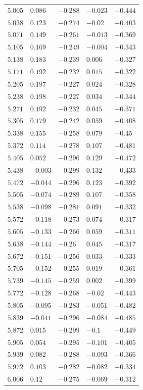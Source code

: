 \begin{table}[h]
\begin{tabular}{rllll}
$5.005$&$0.086$&$-0.288$&$-0.023$&$-0.444$\\
$5.038$&$0.123$&$-0.274$&$-0.02$&$-0.403$\\
$5.071$&$0.149$&$-0.261$&$-0.013$&$-0.369$\\
$5.105$&$0.169$&$-0.249$&$-0.004$&$-0.343$\\
$5.138$&$0.183$&$-0.239$&$0.006$&$-0.327$\\
$5.171$&$0.192$&$-0.232$&$0.015$&$-0.322$\\
$5.205$&$0.197$&$-0.227$&$0.024$&$-0.328$\\
$5.238$&$0.198$&$-0.227$&$0.034$&$-0.344$\\
$5.271$&$0.192$&$-0.232$&$0.045$&$-0.371$\\
$5.305$&$0.179$&$-0.242$&$0.059$&$-0.408$\\
$5.338$&$0.155$&$-0.258$&$0.079$&$-0.45$\\
$5.372$&$0.114$&$-0.278$&$0.107$&$-0.481$\\
$5.405$&$0.052$&$-0.296$&$0.129$&$-0.472$\\
$5.438$&$-0.003$&$-0.299$&$0.132$&$-0.433$\\
$5.472$&$-0.044$&$-0.296$&$0.123$&$-0.392$\\
$5.505$&$-0.074$&$-0.289$&$0.107$&$-0.358$\\
$5.538$&$-0.098$&$-0.281$&$0.091$&$-0.332$\\
$5.572$&$-0.118$&$-0.273$&$0.074$&$-0.317$\\
$5.605$&$-0.133$&$-0.266$&$0.059$&$-0.311$\\
$5.638$&$-0.144$&$-0.26$&$0.045$&$-0.317$\\
$5.672$&$-0.151$&$-0.256$&$0.033$&$-0.333$\\
$5.705$&$-0.152$&$-0.255$&$0.019$&$-0.361$\\
$5.739$&$-0.145$&$-0.259$&$0.002$&$-0.399$\\
$5.772$&$-0.128$&$-0.268$&$-0.02$&$-0.443$\\
$5.805$&$-0.095$&$-0.283$&$-0.051$&$-0.482$\\
$5.839$&$-0.041$&$-0.296$&$-0.084$&$-0.485$\\
$5.872$&$0.015$&$-0.299$&$-0.1$&$-0.449$\\
$5.905$&$0.054$&$-0.295$&$-0.101$&$-0.405$\\
$5.939$&$0.082$&$-0.288$&$-0.093$&$-0.366$\\
$5.972$&$0.103$&$-0.282$&$-0.082$&$-0.334$\\
$6.006$&$0.12$&$-0.275$&$-0.069$&$-0.312$\\

\end{tabular}
\end{table}

